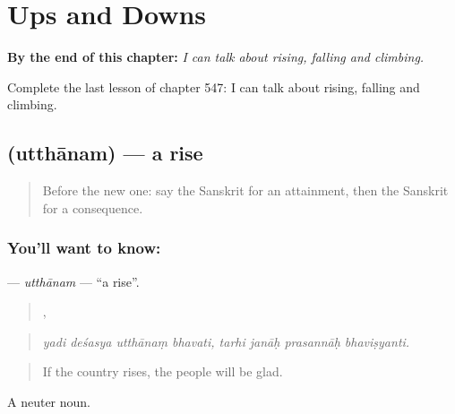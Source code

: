 
\chapter{Ups and Downs}
\label{ch:sa-ups-and-downs}

\begin{chapteropening}
\textbf{By the end of this chapter:} \emph{I can talk about rising, falling and climbing.}

Complete the last lesson of chapter 547: I can talk about rising, falling and climbing.
\end{chapteropening}

\section[\texorpdfstring{\sk{उत्थानम्} (utthānam)}{उत्थानम् (utthānam)}]{ (utthānam) — a rise}

\label{lesson:SA-C547-utthanam}



\begin{quote}
Before the new one: say the Sanskrit for an attainment, then the Sanskrit for a consequence.
\end{quote}

\subsection*{You'll want to know: }
\textbf{} — \emph{utthānam} — \textquotedblleft{}a rise\textquotedblright{}.

\begin{quote}
   ,    
\end{quote}

\begin{quote}
\emph{yadi deśasya utthānaṃ bhavati, tarhi janāḥ prasannāḥ bhaviṣyanti.}
\end{quote}

\begin{quote}
If the country rises, the people will be glad.
\end{quote}

A neuter noun.

